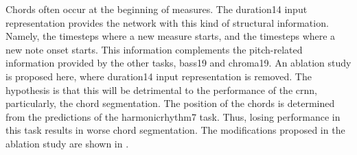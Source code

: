 
Chords often occur at the beginning of measures. The
\gls{duration14} input representation provides the network
with this kind of structural information. Namely, the
timesteps where a new measure starts, and the timesteps
where a new note onset starts. This information complements
the pitch-related information provided by the other tasks,
\gls{bass19} and \gls{chroma19}. An ablation study is
proposed here, where \gls{duration14} input representation
is removed. The hypothesis is that this will be detrimental
to the performance of the \gls{crnn}, particularly, the
chord segmentation. The position of the chords is determined
from the predictions of the \gls{harmonicrhythm7} task.
Thus, losing performance in this task results in worse chord
segmentation. The modifications proposed in the ablation
study are shown in .


